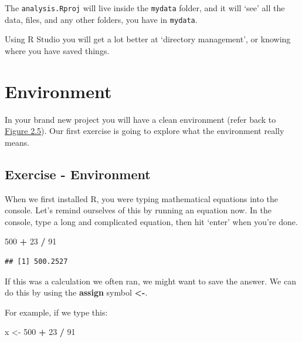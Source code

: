\documentclass[
]{book}
\newenvironment{Shaded}{\begin{snugshade}}{\end{snugshade}}
\newcommand{\DecValTok}[1]{\textcolor[rgb]{0.00,0.00,0.81}{#1}}
\newcommand{\NormalTok}[1]{#1}
\newcommand{\OperatorTok}[1]{\textcolor[rgb]{0.81,0.36,0.00}{\textbf{#1}}}
\newcommand{\StringTok}[1]{\textcolor[rgb]{0.31,0.60,0.02}{#1}}
\begin{document}
The \texttt{analysis.Rproj} will live inside the \texttt{mydata} folder, and it will `see' all the data, files, and any other folders, you have in \texttt{mydata}.

Using R Studio you will get a lot better at `directory management', or knowing where you have saved things.

\hypertarget{environment}{%
\section{Environment}\label{environment}}

In your brand new project you will have a clean environment (refer back to \protect\hyperlink{navigate_rs}{Figure 2.5}). Our first exercise is going to explore what the environment really means.

\hypertarget{ex_env}{%
\subsection{Exercise - Environment}\label{ex_env}}

When we first installed R, you were typing mathematical equations into the console. Let's remind ourselves of this by running an equation now. In the console, type a long and complicated equation, then hit `enter' when you're done.

\begin{Shaded}
\begin{Highlighting}[]
\DecValTok{500} \OperatorTok{+}\StringTok{ }\DecValTok{23} \OperatorTok{/}\StringTok{ }\DecValTok{91}
\end{Highlighting}
\end{Shaded}

\begin{verbatim}
## [1] 500.2527
\end{verbatim}

If this was a calculation we often ran, we might want to save the answer. We can do this by using the \textbf{assign} symbol \textbf{\textless{}-}.

For example, if we type this:

\begin{Shaded}
\begin{Highlighting}[]
\NormalTok{x <-}\StringTok{ }\DecValTok{500} \OperatorTok{+}\StringTok{ }\DecValTok{23} \OperatorTok{/}\StringTok{ }\DecValTok{91}
\end{Highlighting}
\end{Shaded}
\end{document}
